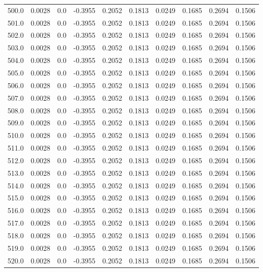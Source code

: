 \begin{longtable}{lrrrrrrrrr}
500.0 & 0.0028 & 0.0 & -0.3955 & 0.2052 & 0.1813 & 0.0249 & 0.1685 & 0.2694 & 0.1506 \\
501.0 & 0.0028 & 0.0 & -0.3955 & 0.2052 & 0.1813 & 0.0249 & 0.1685 & 0.2694 & 0.1506 \\
502.0 & 0.0028 & 0.0 & -0.3955 & 0.2052 & 0.1813 & 0.0249 & 0.1685 & 0.2694 & 0.1506 \\
503.0 & 0.0028 & 0.0 & -0.3955 & 0.2052 & 0.1813 & 0.0249 & 0.1685 & 0.2694 & 0.1506 \\
504.0 & 0.0028 & 0.0 & -0.3955 & 0.2052 & 0.1813 & 0.0249 & 0.1685 & 0.2694 & 0.1506 \\
505.0 & 0.0028 & 0.0 & -0.3955 & 0.2052 & 0.1813 & 0.0249 & 0.1685 & 0.2694 & 0.1506 \\
506.0 & 0.0028 & 0.0 & -0.3955 & 0.2052 & 0.1813 & 0.0249 & 0.1685 & 0.2694 & 0.1506 \\
507.0 & 0.0028 & 0.0 & -0.3955 & 0.2052 & 0.1813 & 0.0249 & 0.1685 & 0.2694 & 0.1506 \\
508.0 & 0.0028 & 0.0 & -0.3955 & 0.2052 & 0.1813 & 0.0249 & 0.1685 & 0.2694 & 0.1506 \\
509.0 & 0.0028 & 0.0 & -0.3955 & 0.2052 & 0.1813 & 0.0249 & 0.1685 & 0.2694 & 0.1506 \\
510.0 & 0.0028 & 0.0 & -0.3955 & 0.2052 & 0.1813 & 0.0249 & 0.1685 & 0.2694 & 0.1506 \\
511.0 & 0.0028 & 0.0 & -0.3955 & 0.2052 & 0.1813 & 0.0249 & 0.1685 & 0.2694 & 0.1506 \\
512.0 & 0.0028 & 0.0 & -0.3955 & 0.2052 & 0.1813 & 0.0249 & 0.1685 & 0.2694 & 0.1506 \\
513.0 & 0.0028 & 0.0 & -0.3955 & 0.2052 & 0.1813 & 0.0249 & 0.1685 & 0.2694 & 0.1506 \\
514.0 & 0.0028 & 0.0 & -0.3955 & 0.2052 & 0.1813 & 0.0249 & 0.1685 & 0.2694 & 0.1506 \\
515.0 & 0.0028 & 0.0 & -0.3955 & 0.2052 & 0.1813 & 0.0249 & 0.1685 & 0.2694 & 0.1506 \\
516.0 & 0.0028 & 0.0 & -0.3955 & 0.2052 & 0.1813 & 0.0249 & 0.1685 & 0.2694 & 0.1506 \\
517.0 & 0.0028 & 0.0 & -0.3955 & 0.2052 & 0.1813 & 0.0249 & 0.1685 & 0.2694 & 0.1506 \\
518.0 & 0.0028 & 0.0 & -0.3955 & 0.2052 & 0.1813 & 0.0249 & 0.1685 & 0.2694 & 0.1506 \\
519.0 & 0.0028 & 0.0 & -0.3955 & 0.2052 & 0.1813 & 0.0249 & 0.1685 & 0.2694 & 0.1506 \\
520.0 & 0.0028 & 0.0 & -0.3955 & 0.2052 & 0.1813 & 0.0249 & 0.1685 & 0.2694 & 0.1506 \\

\end{longtable}
